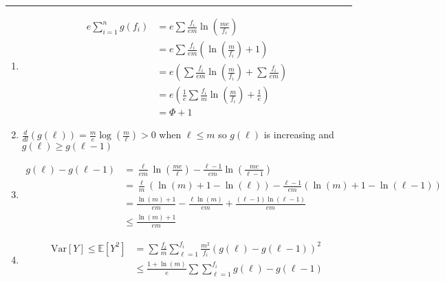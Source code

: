 \documentclass[11pt]{article}
\begin{document}




\begin{quote}

\end{quote}
\hrule


\begin{solution}
\item
\begin{enumerate}
    \item  
    \begin{align*}
        e \sum_{i = 1}^{n} g(f_i) &= e \sum \frac{f_i}{em} \ln(\frac{me}{f_i}) \\
        &= e\sum \frac{f_i}{em} (\ln(\frac{m}{f_i}) + 1) \\
        &= e(\sum \frac{f_i}{em} \ln(\frac{m}{f_i}) + \sum \frac{f_i}{em}) \\
        &= e(\frac{1}{e} \sum \frac{f_i}{m} \ln(\frac{m}{f_i}) + \frac{1}{e}) \\
        &= \Phi + 1
    \end{align*}
    \item
    $\frac{d}{dl}(g(\ell)) = \frac{m}{e}\log(\frac{m}{\ell}) > 0$ when $\ell \leq m$ so $g(\ell)$ is increasing and $g(\ell) \geq g(\ell - 1)$
    \item 
    \begin{align*}
        g(\ell) - g(\ell - 1) &= \frac{\ell}{em}\ln(\frac{me}{\ell}) - \frac{\ell - 1}{em}\ln(\frac{me}{\ell - 1}) \\
        &= \frac{\ell}{m}(\ln(m) + 1 -\ln(\ell)) - \frac{\ell - 1}{em}(\ln(m) + 1 - \ln(\ell - 1)) \\
        &= \frac{\ln(m) + 1}{em} - \frac{\ell \ln(m)}{em} + \frac{(\ell - 1)\ln(\ell -1)}{em} \\
        &\leq \frac{\ln(m) + 1}{em}
    \end{align*}
    \item
    \begin{align*}
        \mathrm{Var}[Y] \leq \mathbb{E}[Y^2] &= \sum \frac{f_i}{m} \sum_{\ell = 1}^{f_i}\frac{m^2}{f_i}(g(\ell) - g(\ell - 1))^2 \\
        &\leq \frac{1 + \ln(m)}{e} \sum \sum_{\ell = 1}^{f_i}g(\ell) - g(\ell - 1) \\

\end{align*}
\end{enumerate}
\end{solution}
\end{document}
